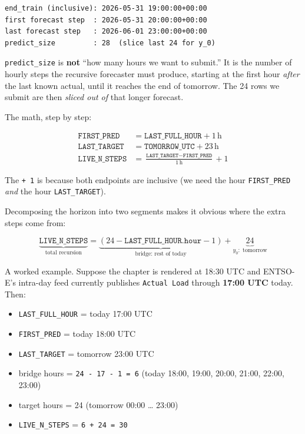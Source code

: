 \documentclass[
  english,
  letterpaper,
]{scrbook}
\providecommand{\tightlist}{%
  \setlength{\itemsep}{0pt}\setlength{\parskip}{0pt}}
\begin{document}
\begin{verbatim}
end_train (inclusive): 2026-05-31 19:00:00+00:00
first forecast step  : 2026-05-31 20:00:00+00:00
last forecast step   : 2026-06-01 23:00:00+00:00
predict_size         : 28  (slice last 24 for y_0)
\end{verbatim}

\begin{tcolorbox}[enhanced jigsaw, arc=.35mm, bottomrule=.15mm, bottomtitle=1mm, breakable, colback=white, colbacktitle=quarto-callout-note-color!10!white, colframe=quarto-callout-note-color-frame, coltitle=black, left=2mm, leftrule=.75mm, opacityback=0, opacitybacktitle=0.6, rightrule=.15mm, title=\textcolor{quarto-callout-note-color}{\faInfo}\hspace{0.5em}{Why is \texttt{predict\_size} usually larger than 24?}, titlerule=0mm, toprule=.15mm, toptitle=1mm]

\texttt{predict\_size} is \textbf{not} ``how many hours we want to
submit.'' It is the number of hourly steps the recursive forecaster must
produce, starting at the first hour \emph{after} the last known actual,
until it reaches the end of tomorrow. The 24 rows we submit are then
\emph{sliced out of} that longer forecast.

The math, step by step:

\[
\begin{aligned}
\texttt{FIRST\_PRED}  &= \texttt{LAST\_FULL\_HOUR} + 1\,\text{h} \\
\texttt{LAST\_TARGET} &= \texttt{TOMORROW\_UTC} + 23\,\text{h} \\
\texttt{LIVE\_N\_STEPS} &= \frac{\texttt{LAST\_TARGET} - \texttt{FIRST\_PRED}}{1\,\text{h}} + 1
\end{aligned}
\]

The \texttt{+\ 1} is because both endpoints are inclusive (we need the
hour \texttt{FIRST\_PRED} \emph{and} the hour \texttt{LAST\_TARGET}).

Decomposing the horizon into two segments makes it obvious where the
extra steps come from:

\[
\underbrace{\texttt{LIVE\_N\_STEPS}}_{\text{total recursion}}
= \underbrace{(24 - \texttt{LAST\_FULL\_HOUR.hour} - 1)}_{\text{bridge: rest of today}}
+ \underbrace{24}_{y_0:\text{ tomorrow}}
\]

A worked example. Suppose the chapter is rendered at 18:30 UTC and
ENTSO-E's intra-day feed currently publishes \texttt{Actual\ Load}
through \textbf{17:00 UTC} today. Then:

\begin{itemize}
\tightlist
\item
  \texttt{LAST\_FULL\_HOUR} = today 17:00 UTC
\item
  \texttt{FIRST\_PRED} = today 18:00 UTC
\item
  \texttt{LAST\_TARGET} = tomorrow 23:00 UTC
\item
  bridge hours = \texttt{24\ -\ 17\ -\ 1\ =\ 6} (today 18:00, 19:00,
  20:00, 21:00, 22:00, 23:00)
\item
  target hours = 24 (tomorrow 00:00 \ldots{} 23:00)
\item
  \texttt{LIVE\_N\_STEPS} = \texttt{6\ +\ 24\ =\ 30}
\end{itemize}


\end{tcolorbox}
\end{document}
